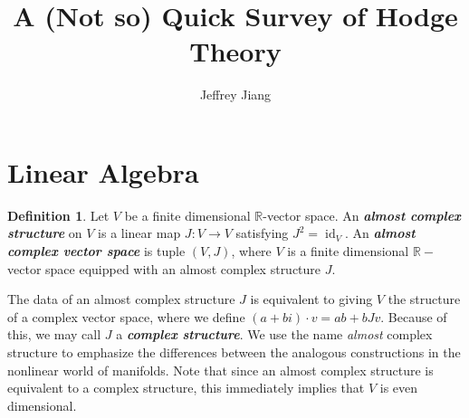 \documentclass[psamsfonts, 12pt]{amsart}
\theoremstyle{definition}
\newtheorem{defn}[thm]{Definition}
\theoremstyle{remark}
\newcommand{\R}{\mathbb{R}}
\newcommand{\ib}[1]{\textbf{\textit{#1}}}
\DeclareMathOperator{\id}{id}
\begin{document}
%
\author{Jeffrey Jiang}
%
\title{A (Not so) Quick Survey of Hodge Theory}
%
\maketitle
%
\tableofcontents
%
\section{Linear Algebra}
%
\begin{defn}
Let $V$ be a finite dimensional $\R$-vector space. An \ib{almost complex structure} on
$V$ is a linear map $J : V \to V$ satisfying $J^2 = \id_V$. An \ib{almost complex
vector space} is tuple $(V,J)$, where $V$ is a finite dimensional $\R-$vector space
equipped with an almost complex structure $J$.
\end{defn}
%
The data of an almost complex structure $J$ is equivalent to giving $V$ the structure
of a complex vector space, where we define $(a + bi)\cdot v = ab + bJv$. Because of this,
we may call $J$ a \ib{complex structure}. We use the name \emph{almost} complex
structure to emphasize the differences between the analogous constructions in the
nonlinear world of manifolds. Note that since an almost complex structure is equivalent
to a complex structure, this immediately implies that $V$ is even dimensional. \\
\end{document}
